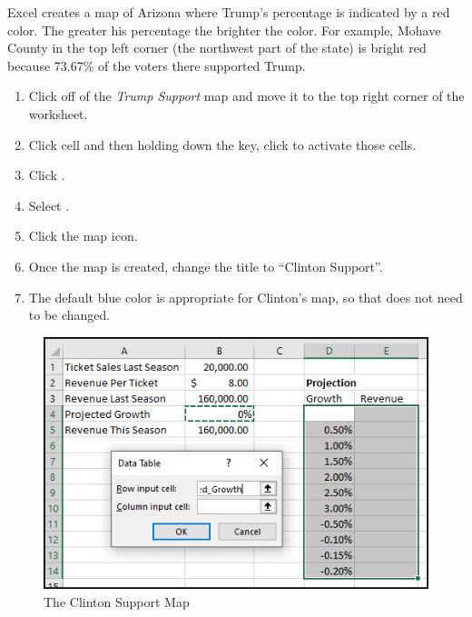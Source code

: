 Excel creates a map of Arizona where Trump's percentage is indicated by a red color. The greater his percentage the brighter the color. For example, Mohave County in the top left corner (the northwest part of the state) is bright red because 73.67\% of the voters there supported Trump.

\begin{enumerate}[resume]
	\item Click off of the \textit{Trump Support} map and move it to the top right corner of the worksheet.
	\item Click cell  and then holding down the  key, click  to activate those cells.
	\item Click .
	\item Select .
	\item Click the map icon.
	\item Once the map is created, change the title to ``Clinton Support''.
	\item The default blue color is appropriate for Clinton's map, so that does not need to be changed.
\end{enumerate}

\begin{figure}[H]
	\centering
	\includegraphics[width=\maxwidth{.95\linewidth}]{gfx/ch08_fig41}
	\caption{The Clinton Support Map}
	\label{08:fig41}
\end{figure}

